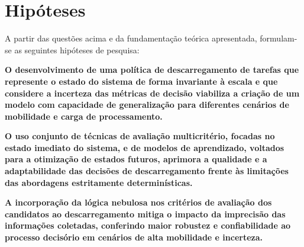 \section{Hipóteses}
\label{sec:hipoteses}

A partir das questões acima e da fundamentação teórica apresentada, formulam-se as seguintes hipóteses de pesquisa:

\begin{alineas}[label=H\arabic*.]

    \item \textbf{O desenvolvimento de uma política de descarregamento de tarefas que represente o estado do sistema de forma invariante à escala e que considere a incerteza das métricas de decisão viabiliza a criação de um modelo com capacidade de generalização para diferentes cenários de mobilidade e carga de processamento.}


    \item \textbf{O uso conjunto de técnicas de avaliação multicritério, focadas no estado imediato do sistema, e de modelos de aprendizado, voltados para a otimização de estados futuros, aprimora a qualidade e a adaptabilidade das decisões de descarregamento frente às limitações das abordagens estritamente determinísticas.}


    \item \textbf{A incorporação da lógica nebulosa nos critérios de avaliação dos candidatos ao descarregamento mitiga o impacto da imprecisão das informações coletadas, conferindo maior robustez e confiabilidade ao processo decisório em cenários de alta mobilidade e incerteza.}


\end{alineas}



